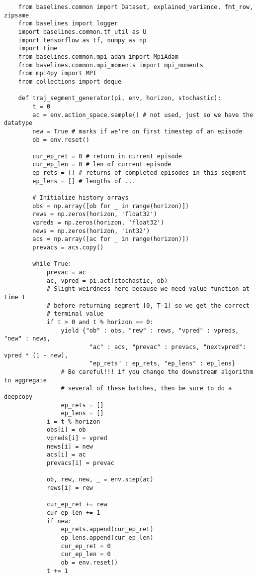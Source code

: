 \begin{verbatim}
    from baselines.common import Dataset, explained_variance, fmt_row, zipsame
    from baselines import logger
    import baselines.common.tf_util as U
    import tensorflow as tf, numpy as np
    import time
    from baselines.common.mpi_adam import MpiAdam
    from baselines.common.mpi_moments import mpi_moments
    from mpi4py import MPI
    from collections import deque

    def traj_segment_generator(pi, env, horizon, stochastic):
        t = 0
        ac = env.action_space.sample() # not used, just so we have the datatype
        new = True # marks if we're on first timestep of an episode
        ob = env.reset()

        cur_ep_ret = 0 # return in current episode
        cur_ep_len = 0 # len of current episode
        ep_rets = [] # returns of completed episodes in this segment
        ep_lens = [] # lengths of ...

        # Initialize history arrays
        obs = np.array([ob for _ in range(horizon)])
        rews = np.zeros(horizon, 'float32')
        vpreds = np.zeros(horizon, 'float32')
        news = np.zeros(horizon, 'int32')
        acs = np.array([ac for _ in range(horizon)])
        prevacs = acs.copy()

        while True:
            prevac = ac
            ac, vpred = pi.act(stochastic, ob)
            # Slight weirdness here because we need value function at time T
            # before returning segment [0, T-1] so we get the correct
            # terminal value
            if t > 0 and t % horizon == 0:
                yield {"ob" : obs, "rew" : rews, "vpred" : vpreds, "new" : news,
                        "ac" : acs, "prevac" : prevacs, "nextvpred": vpred * (1 - new),
                        "ep_rets" : ep_rets, "ep_lens" : ep_lens}
                # Be careful!!! if you change the downstream algorithm to aggregate
                # several of these batches, then be sure to do a deepcopy
                ep_rets = []
                ep_lens = []
            i = t % horizon
            obs[i] = ob
            vpreds[i] = vpred
            news[i] = new
            acs[i] = ac
            prevacs[i] = prevac

            ob, rew, new, _ = env.step(ac)
            rews[i] = rew

            cur_ep_ret += rew
            cur_ep_len += 1
            if new:
                ep_rets.append(cur_ep_ret)
                ep_lens.append(cur_ep_len)
                cur_ep_ret = 0
                cur_ep_len = 0
                ob = env.reset()
            t += 1


\end{verbatim}
